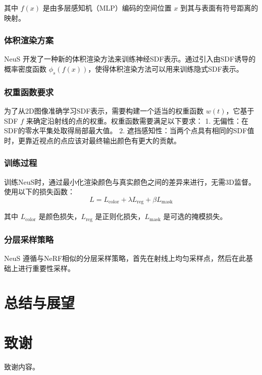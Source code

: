 \documentclass{nwputhesis}
\begin{document}
其中 \( f(x) \) 是由多层感知机（MLP）编码的空间位置 \( x \) 到其与表面有符号距离的映射。

\subsubsection{体积渲染方案}
NeuS 开发了一种新的体积渲染方法来训练神经SDF表示。通过引入由SDF诱导的概率密度函数 \( \phi_s(f(x)) \)，使得体积渲染方法可以用来训练隐式SDF表示。

\subsubsection{权重函数要求}
为了从2D图像准确学习SDF表示，需要构建一个适当的权重函数 \( w(t) \)，它基于SDF \( f \) 来确定沿射线的点的权重。权重函数需要满足以下要求：
1. 无偏性：在SDF的零水平集处取得局部最大值。
2. 遮挡感知性：当两个点具有相同的SDF值时，更靠近视点的点应该对最终输出颜色有更大的贡献。

\subsubsection{训练过程}
训练NeuS时，通过最小化渲染颜色与真实颜色之间的差异来进行，无需3D监督。使用以下的损失函数：
\[ L = L_{\text{color}} + \lambda L_{\text{reg}} + \beta L_{\text{mask}} \]


其中 \( L_{\text{color}} \) 是颜色损失，\( L_{\text{reg}} \) 是正则化损失，\( L_{\text{mask}} \) 是可选的掩模损失。

\subsubsection{分层采样策略}
NeuS 遵循与NeRF相似的分层采样策略，首先在射线上均匀采样点，然后在此基础上进行重要性采样。


\makespace
\section{总结与展望}


\makespace
\section*{致谢}

致谢内容。

\makespace
\end{document}
